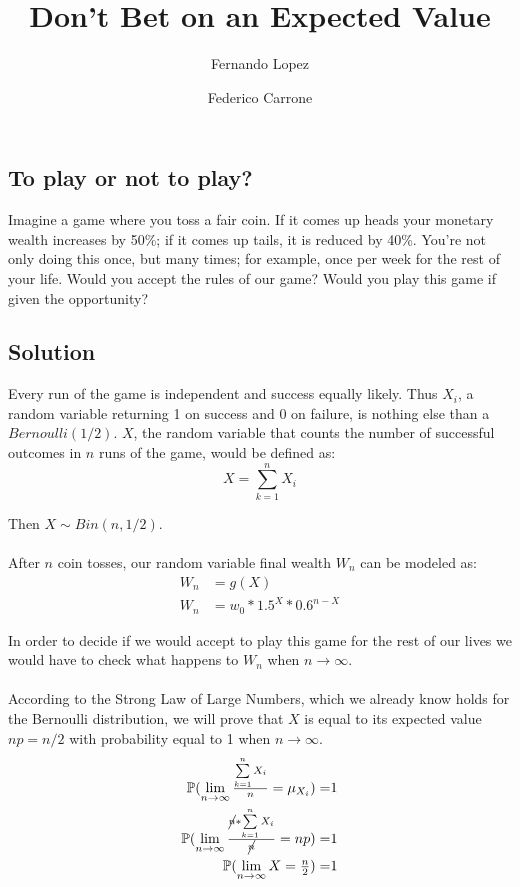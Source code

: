 \documentclass[12pt]{article}
\title{Don't Bet on an Expected Value}
\author{Fernando Lopez \and Federico Carrone}
\begin{document}
\maketitle
{}

\subsection{To play or not to play?}

Imagine a game where you toss a fair coin. If it comes up heads your monetary wealth increases by 50\%; if it comes up tails, it is reduced by 40\%. You’re not only doing this once, but many times; for example, once per week for the rest of your life. Would you accept the rules of our game? Would you play this game if given the opportunity?

\subsection{Solution}
Every run of the game is independent and success equally likely. Thus $X_i$, a random variable returning 1 on success and 0 on failure, is nothing else than a $Bernoulli(1/2)$. $X$, the random variable that counts the number of successful outcomes in $n$ runs of the game, would be defined as:
\begin{equation*}
 X = \sum\limits_{k=1}^{n} X_i
\end{equation*}

Then $X \sim Bin(n, 1/2)$.
\\\\
After $n$ coin tosses, our random variable final wealth $W_n$ can be modeled as:
\begin{equation*}
  \begin{split}
    W_n &= g(X)\\
    W_n &= w_0 * 1.5^X * 0.6^{n-X}
  \end{split}
\end{equation*}

In order to decide if we would accept to play this game for the rest of our lives we would have to check what happens to $W_n$ when $n \rightarrow \infty$.
\\\\
According to the Strong Law of Large Numbers, which we already know holds for the Bernoulli distribution, we will prove that $X$ is equal to its expected value $np = n/2$ with probability equal to 1 when $n \rightarrow \infty$.
\begin{equation*}
  \begin{split}
    \mathbb{P}(\lim_{n\to\infty} \tfrac{\sum\limits_{k=1}^{n} X_i}{n} = \mu_{X_i}) =& 1\\
    \mathbb{P}(\lim_{n\to\infty} \tfrac{\cancel{n}*\sum\limits_{k=1}^{n} X_i}{\cancel{n}} = np) =& 1\\
    \mathbb{P}(\lim_{n\to\infty} X = \tfrac{n}{2}) =& 1
  \end{split}
\end{equation*}
\end{document}
